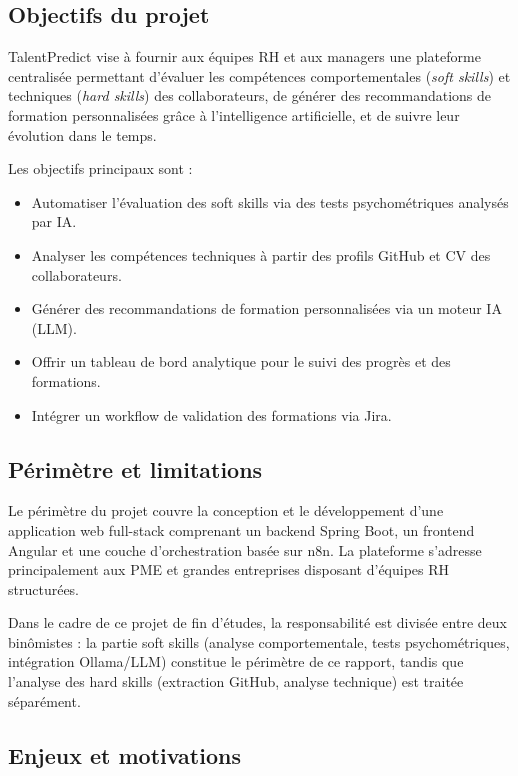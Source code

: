 \documentclass[12pt,a4paper]{report}
\begin{document}
\subsection{Objectifs du projet}

TalentPredict vise à fournir aux équipes RH et aux managers une plateforme centralisée permettant
d'évaluer les compétences comportementales (\textit{soft skills}) et techniques (\textit{hard
skills}) des collaborateurs, de générer des recommandations de formation personnalisées grâce
à l'intelligence artificielle, et de suivre leur évolution dans le temps.

Les objectifs principaux sont :
\begin{itemize}
  \item Automatiser l'évaluation des soft skills via des tests psychométriques analysés par IA.
  \item Analyser les compétences techniques à partir des profils GitHub et CV des collaborateurs.
  \item Générer des recommandations de formation personnalisées via un moteur IA (LLM).
  \item Offrir un tableau de bord analytique pour le suivi des progrès et des formations.
  \item Intégrer un workflow de validation des formations via Jira.
\end{itemize}

\subsection{Périmètre et limitations}

Le périmètre du projet couvre la conception et le développement d'une application web full-stack
comprenant un backend Spring Boot, un frontend Angular et une couche d'orchestration basée sur
n8n. La plateforme s'adresse principalement aux PME et grandes entreprises disposant d'équipes
RH structurées.

Dans le cadre de ce projet de fin d'études, la responsabilité est divisée entre deux binômistes :
la partie soft skills (analyse comportementale, tests psychométriques, intégration Ollama/LLM)
constitue le périmètre de ce rapport, tandis que l'analyse des hard skills (extraction GitHub,
analyse technique) est traitée séparément.

\subsection{Enjeux et motivations}
\end{document}
